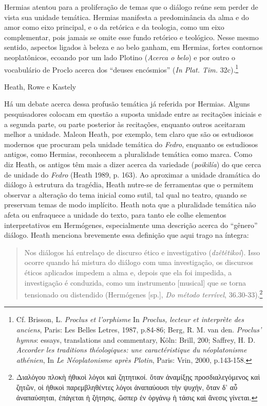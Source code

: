 Hermias atentou para a proliferação de temas que o diálogo reúne sem
perder de vista sua unidade temática. Hermias manifesta a predominância
da alma e do amor como eixo principal, e o da retórica e da teologia,
como um eixo complementar, pois jamais se omite esse fundo retórico e
teológico. Nesse mesmo sentido, aspectos ligados à beleza e ao belo
ganham, em Hermias, fortes contornos neoplatônicos, ecoando por um lado
Plotino (\emph{Acerca o belo}) e por outro o vocabulário de Proclo
acerca dos ``deuses encósmios'' (\emph{In Plat. Tim.} 32c).\footnote{Cf.
  Brisson, L. \emph{Proclus et l'orphisme} In \emph{Proclus, lecteur et
  interprète des anciens}, Paris: Les Belles Letres, 1987, p.84-86;
  Berg, R. M. van den. \emph{Proclus' hymns}: essays, translations and
  commentary, Köln: Brill, 200; Saffrey, H. D. \emph{Accorder les
  traditions théologiques: une caractéristique du néoplatonisme
  athénien}, In \emph{Le Néoplatonisme après Plotin}, Paris: Vrin, 2000,
  p.143-158.}

Heath, Rowe e Kastely

Há um debate acerca dessa profusão temática já referida por Hermias.
Alguns pesquisadores colocam em questão a suposta unidade entre as
recitações iniciais e a segunda parte, ou parte posterior às recitações,
enquanto outros aceitaram melhor a unidade. Malcon Heath, por exemplo,
tem claro que são os estudiosos modernos que procuram pela unidade
temática do \emph{Fedro}, enquanto os estudiosos antigos, como Hermias,
reconhecem a pluralidade temática como marca. Como diz Heath, os antigos
têm mais a dizer acerca da variedade (\emph{poikilía}) do que cerca de
unidade do \emph{Fedro} (Heath 1989, p. 163). Ao aproximar a unidade
dramática do diálogo à estrutura da tragédia, Heath nutre-se de
ferramentas que o permitem observar a alteração do tema inicial como
sutil, tal qual no teatro, quando se preservam temas de modo implícito.
Heath nota que a pluralidade temática não afeta ou enfraquece a unidade
do texto, para tanto ele colhe elementos interpretativos em Hermógenes,
especialmente uma descrição acerca do ``gênero'' diálogo. Heath menciona
brevemente essa definição que aqui trago na íntegra:

\begin{quote}
Nos diálogos há entrelaço de discurso ético e investigativo
(\emph{dzêtêtikoí}). Isso ocorre quando há mistura do diálogo com uma
investigação, os discursos éticos aplicados impedem a alma e, depois que
ela foi impedida, a investigação é conduzida, como um instrumento
{[}musical{]} que se torna tensionado ou distendido (Hermógenes
{[}sp.{]}, \emph{Do método terrível}, 36.30-33).\footnote{Διαλόγου πλοκὴ
  ἠθικοὶ λόγοι καὶ ζητητικοί. ὅταν ἀναμίξῃς προσδιαλεγόμενος καὶ ζητῶν,
  οἱ ἠθικοὶ παρεμβληθέντες λόγοι ἀναπαύουσι τὴν ψυχήν, ὅταν δ' αὖ
  ἀναπαύσηται, ἐπάγεται ἡ ζήτησις, ὥσπερ ἐν ὀργάνῳ ἡ τάσις καὶ ἄνεσις
  γίνεται.}
\end{quote}

